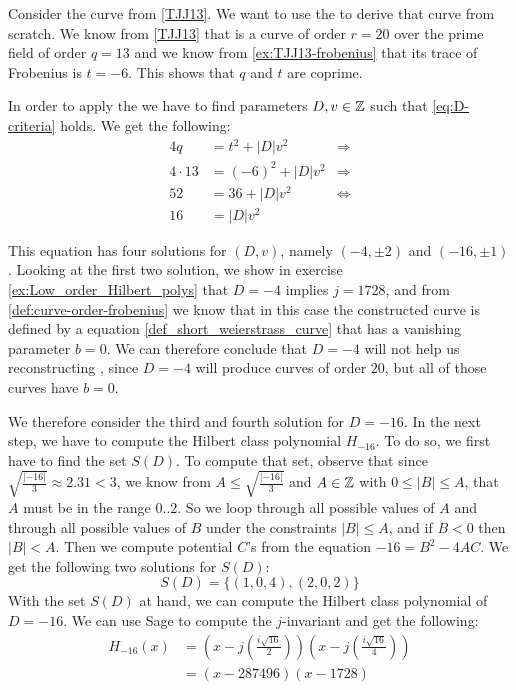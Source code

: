 \begin{example}
 Consider the  curve \TJJ{} from \examplename{} \ref{TJJ13}. We want to use the  to derive that curve from scratch. We know from \examplename{} \ref{TJJ13} that \TJJ{} is a curve of order $r=20$ over the prime field of order $q=13$ and we know from \examplename{} \ref{ex:TJJ13-frobenius} that its trace of Frobenius is $t=-6$. This shows that $q$ and $t$ are coprime. 

In order to apply the  we have to find parameters $D,v\in\mathbb{Z}$ such that \ref{eq:D-criteria} holds. We get the following:
\begin{align*}
4q & = t^2+ |D|v^2 & \Rightarrow \\
4\cdot 13 & = (-6)^2+ |D|v^2 & \Rightarrow \\
52 & = 36 + |D|v^2 & \Leftrightarrow \\
16 & = |D|v^2
\end{align*}

This equation has four solutions for $(D,v)$, namely $(-4,\pm 2)$ and $(-16,\pm 1)$. Looking at the first two solution, we show in exercise \ref{ex:Low_order_Hilbert_polys} that $D=-4$ implies $j=1728$, and from \ref{def:curve-order-frobenius} we know that in this case the constructed curve is defined by a  equation \ref{def_short_weierstrass_curve} that has a vanishing parameter $b=0$. We can therefore conclude that $D=-4$ will not help us reconstructing \TJJ{}, since $D=-4$ will produce curves of order $20$, but all of those curves have $b=0$.

We therefore consider the third and fourth solution for $D=-16$. In the next step, we have to compute the Hilbert class polynomial $H_{-16}$. To do so, we first have to find the set $S(D)$. To compute that set, observe that since $\sqrt{\frac{|-16|}{3}}\approx 2.31<3$, we know from $A\leq \sqrt{\frac{|-16|}{3}}$ and $A\in\mathbb{Z}$ with $0\leq |B|\leq A$, that $A$ must be in the range $0..2$. So we loop through all possible values of $A$ and through all possible values of $B$ under the constraints $|B|\leq A$, and if $B<0$ then $|B|<A$.
Then we compute potential $C$'s from the equation $-16 = B^2 -4AC$. We get the following two solutions for $S(D)$:
$$
S(D)=\{(1,0,4),(2,0,2)\}
$$
With the set $S(D)$ at hand, we can compute the Hilbert class polynomial of $D=-16$. We can use Sage to compute the $j$-invariant and get the following:
\begin{align*}
H_{-16}(x) &= \left(x - j\left(\frac{i\sqrt{16}}{2}\right)\right)
 \left(x - j\left(\frac{i\sqrt{16}}{4}\right)\right) \\
           &= (x- 287496)(x-1728)
\end{align*}


\end{example}
